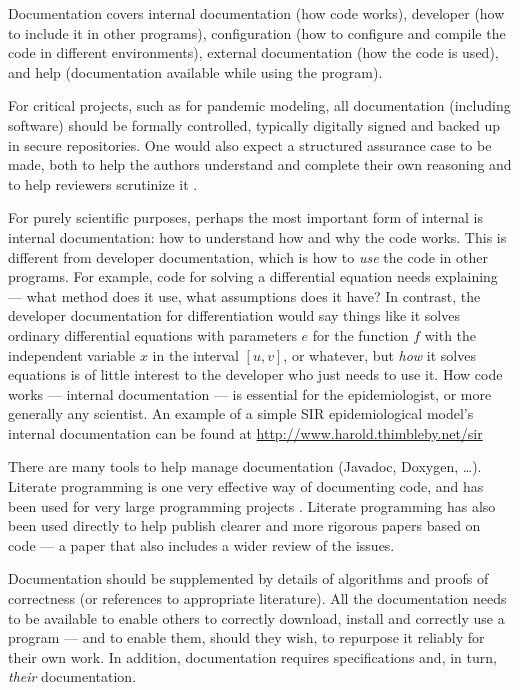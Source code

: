 \documentclass[10pt,a4paper]{article}
\begin{document}
Documentation covers internal documentation (how code works), developer (how to include it in other programs), configuration (how to configure and compile the code in different environments), external documentation (how the code is used), and help (documentation available while using the program). 

{For critical projects, such as for pandemic modeling, all documentation (including software) should be formally controlled, typically digitally signed and backed up in secure repositories. One would also expect a structured assurance case to be made, both to help the authors understand and complete their own reasoning and to help reviewers scrutinize it \cite{assurance-case}.
}

For purely scientific purposes, perhaps the most important form of internal is internal documentation: how to understand how and why the code works. This is different from developer documentation, which is how to \emph{use\/} the code in other programs. For example, code for solving a differential equation needs explaining --- what method does it use, what assumptions does it have? In contrast, the developer documentation for differentiation would say things like it solves ordinary differential equations with parameters $e$ for the function $f$ with the independent variable $x$ in the interval $[u,v]$, or whatever, but \emph{how\/} it solves equations is of little interest to the developer who just needs to use it. How code works --- internal documentation --- is essential for the epidemiologist, or more generally any scientist. An example of a simple SIR epidemiological model's internal documentation can be found at \url{http://www.harold.thimbleby.net/sir} 

There are many tools to help manage documentation (Javadoc, Doxygen, \ldots). Literate programming is one very effective way of documenting code, and has been used for very large programming projects \cite{LP}. Literate programming has also been used directly to help publish clearer and more rigorous papers based on code \cite{relit} --- a paper that also includes a wider review of the issues.

Documentation should be supplemented by details of algorithms and proofs of correctness (or references to appropriate literature). All the documentation needs to be available to enable others to correctly download, install and correctly use a program --- and to enable them, should they wish, to repurpose it reliably for their own work. In addition, documentation requires specifications and, in turn, \emph{their\/} documentation. 
\end{document}
